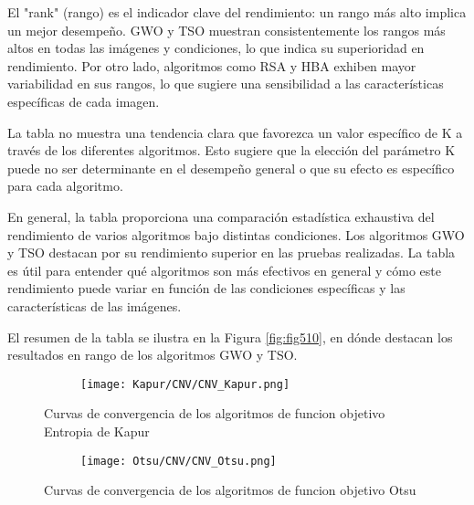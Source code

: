 \documentclass[conference]{IEEEtran}
\begin{document}
\noindent El "rank" (rango) es el indicador clave del rendimiento: un rango más alto implica un mejor desempeño. GWO y TSO muestran consistentemente los rangos más altos en todas las imágenes y condiciones, lo que indica su superioridad en rendimiento. Por otro lado, algoritmos como RSA y HBA exhiben mayor variabilidad en sus rangos, lo que sugiere una sensibilidad a las características específicas de cada imagen.

\noindent La tabla no muestra una tendencia clara que favorezca un valor específico de K a través de los diferentes algoritmos. Esto sugiere que la elección del parámetro K puede no ser determinante en el desempeño general o que su efecto es específico para cada algoritmo.

\noindent En general, la tabla proporciona una comparación estadística exhaustiva del rendimiento de varios algoritmos bajo distintas condiciones. Los algoritmos GWO y TSO destacan por su rendimiento superior en las pruebas realizadas. La tabla es útil para entender qué algoritmos son más efectivos en general y cómo este rendimiento puede variar en función de las condiciones específicas y las características de las imágenes.

\noindent El resumen de la tabla se ilustra en la Figura \ref{fig:fig510}, en dónde destacan los resultados en rango de los algoritmos GWO y TSO.



\begin{figure}
	\centering
	\begin{subfigure}{0.5\textwidth}
		\texttt{[image: Kapur/CNV/CNV\_Kapur.png]}
	\end{subfigure}
	\caption{Curvas de convergencia de los algoritmos de funcion objetivo Entropia de Kapur}
	\label{fig:imagenes}    
\end{figure}


\begin{figure}
	\centering
	\begin{subfigure}{0.5\textwidth}
		\texttt{[image: Otsu/CNV/CNV\_Otsu.png]}
	\end{subfigure}
	\caption{Curvas de convergencia de los algoritmos de funcion objetivo Otsu}
	\label{fig:imagenes}    
\end{figure}
\end{document}
